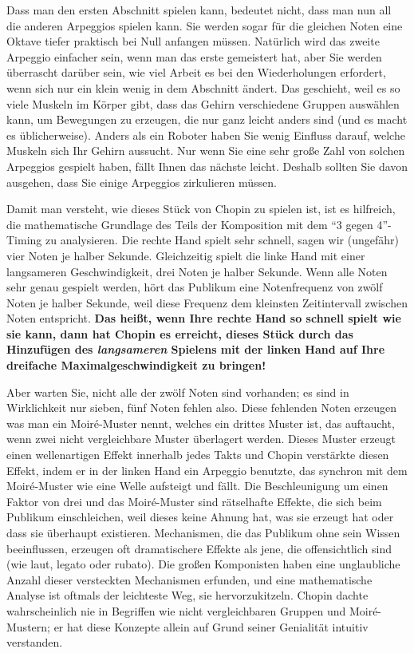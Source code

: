 Dass man den ersten Abschnitt spielen kann, bedeutet nicht, dass man nun all die anderen Arpeggios spielen kann.
Sie werden sogar für die gleichen Noten eine Oktave tiefer praktisch bei Null anfangen müssen.
Natürlich wird das zweite Arpeggio einfacher sein, wenn man das erste gemeistert hat, aber Sie werden überrascht darüber sein, wie viel Arbeit es bei den Wiederholungen erfordert, wenn sich nur ein klein wenig in dem Abschnitt ändert.
Das geschieht, weil es so viele Muskeln im Körper gibt, dass das Gehirn verschiedene Gruppen auswählen kann, um Bewegungen zu erzeugen, die nur ganz leicht anders sind (und es macht es üblicherweise).
Anders als ein Roboter haben Sie wenig Einfluss darauf, welche Muskeln sich Ihr Gehirn aussucht.
Nur wenn Sie eine sehr große Zahl von solchen Arpeggios gespielt haben, fällt Ihnen das nächste leicht.
Deshalb sollten Sie davon ausgehen, dass Sie einige Arpeggios zirkulieren müssen.

Damit man versteht, wie dieses Stück von Chopin zu spielen ist, ist es hilfreich, die mathematische Grundlage des Teils der Komposition mit dem \enquote{3 gegen 4}-Timing zu analysieren.
Die rechte Hand spielt sehr schnell, sagen wir (ungefähr) vier Noten je halber Sekunde.
Gleichzeitig spielt die linke Hand mit einer langsameren Geschwindigkeit, drei Noten je halber Sekunde.
Wenn alle Noten sehr genau gespielt werden, hört das Publikum eine Notenfrequenz von zwölf Noten je halber Sekunde, weil diese Frequenz dem kleinsten Zeitintervall zwischen Noten entspricht.
\textbf{Das heißt, wenn Ihre rechte Hand so schnell spielt wie sie kann, dann hat Chopin es erreicht, dieses Stück durch das Hinzufügen des \textit{langsameren} Spielens mit der linken Hand auf Ihre dreifache Maximalgeschwindigkeit zu bringen!}

Aber warten Sie, nicht alle der zwölf Noten sind vorhanden; es sind in Wirklichkeit nur sieben, fünf Noten fehlen also.
Diese fehlenden Noten erzeugen was man ein Moiré-Muster nennt, welches ein drittes Muster ist, das auftaucht, wenn zwei nicht vergleichbare Muster überlagert werden.
Dieses Muster erzeugt einen wellenartigen Effekt innerhalb jedes Takts und Chopin verstärkte diesen Effekt, indem er in der linken Hand ein Arpeggio benutzte, das synchron mit dem Moiré-Muster wie eine Welle aufsteigt und fällt.
Die Beschleunigung um einen Faktor von drei und das Moiré-Muster sind rätselhafte Effekte, die sich beim Publikum einschleichen, weil dieses keine Ahnung hat, was sie erzeugt hat oder dass sie überhaupt existieren.
Mechanismen, die das Publikum ohne sein Wissen beeinflussen, erzeugen oft dramatischere Effekte als jene, die offensichtlich sind (wie laut, legato oder rubato).
Die großen Komponisten haben eine unglaubliche Anzahl dieser versteckten Mechanismen erfunden, und eine mathematische Analyse ist oftmals der leichteste Weg, sie hervorzukitzeln.
Chopin dachte wahrscheinlich nie in Begriffen wie nicht vergleichbaren Gruppen und Moiré-Mustern; er hat diese Konzepte allein auf Grund seiner Genialität intuitiv verstanden.


